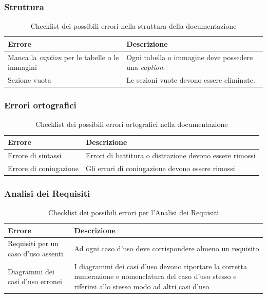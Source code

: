 \documentclass[a4paper,10pt]{article}
\begin{document}
\subsubsection{Struttura}
\begin{table}[H]
\centering
\renewcommand{\arraystretch}{1.2}
\begin{tabular}{|p{4cm}|p{9cm}|}
\hline
\textbf{Errore} & \textbf{Descrizione} \\
\hline
Manca la \textit{caption} per le tabelle o le immagini &
Ogni tabella o immagine deve possedere una \textit{caption}. \\
\hline
Sezione vuota &
Le sezioni vuote devono essere eliminate. \\
\hline
\end{tabular}
\caption{Checklist dei possibili errori nella struttura della documentazione}
\label{tab:checklist-struttura}
\end{table}
\subsubsection{Errori ortografici}
\begin{table}[H]
\centering
\renewcommand{\arraystretch}{1.2}
\begin{tabular}{|p{4cm}|p{9cm}|}
\hline
\textbf{Errore} & \textbf{Descrizione} \\
\hline
Errore di sintassi & Errori di battitura o distrazione devono essere rimossi \\
\hline
Errore di coniugazione & Gli errori di coniugazione devono essere rimossi \\
\hline
\end{tabular}
\caption{Checklist dei possibili errori ortografici nella documentazione}
\label{tab:checklist-ortografia}
\end{table}

\subsubsection{Analisi dei Requisiti}
\begin{table}[H]
\centering
\renewcommand{\arraystretch}{1.2}
\begin{tabular}{|p{4cm}|p{9cm}|}
\hline
\textbf{Errore} & \textbf{Descrizione} \\
\hline
Requisiti per un caso d'uso assenti & Ad ogni caso d'uso deve corrispondere almeno un requisito \\
\hline
Diagrammi dei casi d'uso erronei & I diagrammi dei casi d'uso devono riportare la corretta numerazione e nomenclatura del caso d'uso stesso e riferirsi allo stesso modo ad altri casi d'uso \\
\hline
\end{tabular}
\caption{Checklist dei possibili errori per l'Analisi dei Requisiti}
\label{tab:checklist-analisi}
\end{table}
\end{document}
